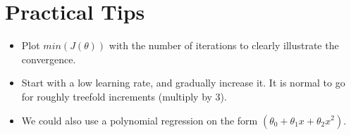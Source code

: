 \section{Practical Tips}
\begin{itemize}
    \item Plot $min(J(\theta))$ with the number of iterations to clearly illustrate the convergence.
    \item Start with a low learning rate, and gradually increase it. It is normal to go for roughly treefold increments (multiply by 3).
    \item We could also use a polynomial regression on the form $(\theta_0 + \theta_1x + \theta_2x^2)$.
\end{itemize}
